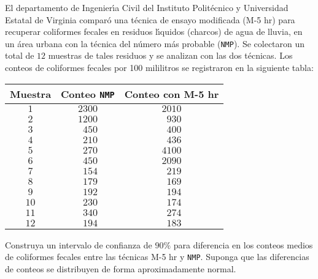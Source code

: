 \begin{enunciado}
 El departamento de Ingenier\'{\i}a Civil del Instituto Polit\'ecnico y Universidad Estatal de Virginia compar\'o una t\'ecnica de ensayo modificada (M-5 hr) para recuperar coliformes fecales en residuos l\'{\i}quidos (charcos) de agua de lluvia, en un \'area urbana con la t\'ecnica del n\'umero m\'as probable (\texttt{NMP}). Se colectaron un total de $12$ muestras de tales residuos y se analizan con las dos t\'ecnicas. Los conteos de coliformes fecales por 100 mililitros se registraron en la siguiente tabla:
 \begin{center}
  \begin{tabular}{ccc}
   \textbf{Muestra} & \textbf{Conteo \texttt{NMP}} & \textbf{Conteo con M-5 hr} \\
   \hline 
   $1$ & $2300$ & $2010$ \\
   $2$ & $1200$ & $\phantom{2}930$ \\
   $3$ & $\phantom{1}450$ & $\phantom{2}400$ \\
   $4$ & $\phantom{1}210$ & $\phantom{2}436$ \\
   $5$ & $\phantom{1}270$ & $4100$ \\
   $6$ & $\phantom{1}450$ & $2090$ \\
   $7$ & $\phantom{1}154$ & $\phantom{2}219$ \\
   $8$ & $\phantom{1}179$ & $\phantom{2}169$ \\
   $9$ & $\phantom{1}192$ & $\phantom{2}194$ \\
   $10$ & $\phantom{1}230$ & $\phantom{2}174$ \\
   $11$ & $\phantom{1}340$ & $\phantom{2}274$ \\
   $12$ & $\phantom{1}194$ & $\phantom{2}183$ \\
  \end{tabular}
 \end{center}
 Construya un intervalo de confianza de $90\%$ para diferencia en los conteos medios de coliformes fecales entre las t\'ecnicas M-5 hr y \texttt{NMP}. Suponga que las diferencias de conteos se distribuyen de forma aproximadamente normal.
\end{enunciado}

